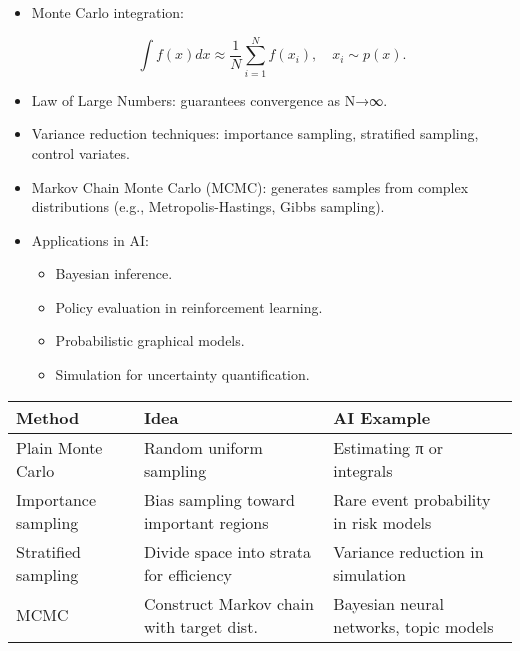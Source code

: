 \documentclass[
  letterpaper,
  DIV=11,
  numbers=noendperiod]{scrreprt}
\providecommand{\tightlist}{%
  \setlength{\itemsep}{0pt}\setlength{\parskip}{0pt}}
\begin{document}
\begin{itemize}
\item
  Monte Carlo integration:

  \[
  \int f(x) dx \approx \frac{1}{N}\sum_{i=1}^N f(x_i), \quad x_i \sim p(x).
  \]
\item
  Law of Large Numbers: guarantees convergence as N→∞.
\item
  Variance reduction techniques: importance sampling, stratified
  sampling, control variates.
\item
  Markov Chain Monte Carlo (MCMC): generates samples from complex
  distributions (e.g., Metropolis-Hastings, Gibbs sampling).
\item
  Applications in AI:

  \begin{itemize}
  \tightlist
  \item
    Bayesian inference.
  \item
    Policy evaluation in reinforcement learning.
  \item
    Probabilistic graphical models.
  \item
    Simulation for uncertainty quantification.
  \end{itemize}
\end{itemize}

\begin{longtable}[]{@{}
  >{\raggedright\arraybackslash}p{}
  >{\raggedright\arraybackslash}p{}
  >{\raggedright\arraybackslash}p{}@{}}
\toprule\noalign{}
\begin{minipage}[b]{\linewidth}\raggedright
Method
\end{minipage} & \begin{minipage}[b]{\linewidth}\raggedright
Idea
\end{minipage} & \begin{minipage}[b]{\linewidth}\raggedright
AI Example
\end{minipage} \\
\midrule\noalign{}
\endhead
\bottomrule\noalign{}
\endlastfoot
Plain Monte Carlo & Random uniform sampling & Estimating π or
integrals \\
Importance sampling & Bias sampling toward important regions & Rare
event probability in risk models \\
Stratified sampling & Divide space into strata for efficiency & Variance
reduction in simulation \\
MCMC & Construct Markov chain with target dist. & Bayesian neural
networks, topic models \\
\end{longtable}
\end{document}
